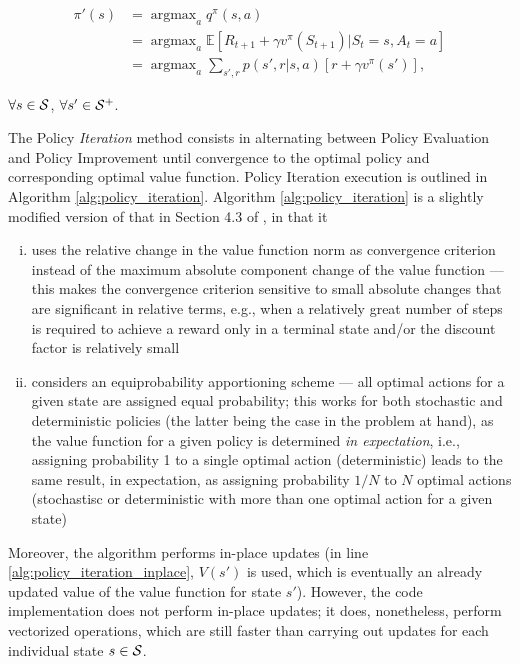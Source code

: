 \documentclass[a4paper]{article}
\DeclareMathOperator*{\argmax}{argmax}
\begin{document}
\begin{align}
\pi'\left( s \right) &= \argmax_{a} q^{\pi} \left( s,a \right) \\
                         &= \argmax_{a} \mathbb{E} \left[ R_{t+1} + \gamma v^{\pi}\left( S_{t+1} \right) | S_t = s , A_t = a \right] \\
                         &= \argmax_{a} \sum\limits_{s',r} { p\left( {s',r|s,a} \right) \left[ r + \gamma v^{\pi}\left( s' \right) \right] },
\end{align}

$\forall s \in \cal{S}$, $\forall s' \in \cal{S^{+}}$.

The Policy \textit{Iteration} method consists in alternating between Policy Evaluation and Policy Improvement until convergence to the optimal policy and corresponding optimal value function. Policy Iteration execution is outlined in Algorithm \ref{alg:policy_iteration}. Algorithm \ref{alg:policy_iteration} is a slightly modified version of that in Section 4.3 of \cite{10.5555/3312046}, in that it

\begin{enumerate}[i.]
\item uses the relative change in the value function norm as convergence criterion instead of the maximum absolute component change of the value function --- this makes the convergence criterion sensitive to small absolute changes that are significant in relative terms, e.g., when a relatively great number of steps is required to achieve a reward only in a terminal state and/or the discount factor is relatively small 
\item considers an equiprobability apportioning scheme --- all optimal actions for a given state are assigned equal probability; this works for both stochastic and deterministic policies (the latter being the case in the problem at hand), as the value function for a given policy is determined \textit{in expectation}, i.e., assigning probability 1 to a single optimal action (deterministic) leads to the same result, in expectation, as assigning probability $1/N$ to $N$ optimal actions (stochastisc or deterministic with more than one optimal action for a given state)
\end{enumerate}

Moreover, the algorithm performs in-place updates (in line \ref{alg:policy_iteration_inplace}, $V(s')$ is used, which is eventually an already updated value of the value function for state $s'$). However, the code implementation does not perform in-place updates; it does, nonetheless, perform vectorized operations, which are still faster than carrying out updates for each individual state $s \in {\cal S}$. 
\end{document}
